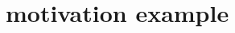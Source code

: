 \documentclass[conference]{IEEEtran}
\begin{document}
	
	
	
	\section{motivation example}
	\label{sec:example}
	
\end{document}
